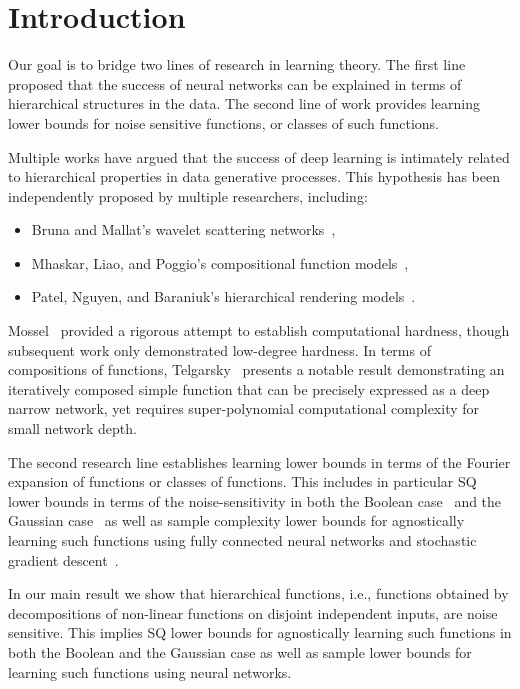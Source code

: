 \documentclass[12pt,letterpaper]{amsart}
\newcommand{\1}[1]{1_{\left\{#1\right\}}}
\theoremstyle{definition}
\theoremstyle{remark}
\begin{document}
\section{Introduction}\label{sec:introduction}

Our goal is to bridge two lines of research in learning theory. The first line proposed that the success of neural networks can be explained in terms 
 of hierarchical structures in the data. 
 The second line of work provides learning lower bounds for noise sensitive functions, or classes of such functions. 
 
Multiple works have argued that the success of deep learning is intimately related to hierarchical properties in data generative processes.
This hypothesis has been independently proposed by multiple researchers, including:
\begin{itemize}
\item
Bruna and Mallat's wavelet scattering networks~\cite{BrunaMallat:13},
\item
Mhaskar, Liao, and Poggio's compositional function models~\cite{MhLiPo:16},
\item
Patel, Nguyen, and Baraniuk's hierarchical rendering models~\cite{PaNgBa:2015}.
\end{itemize}
Mossel~\cite{Mossel:19deep} provided a rigorous attempt to establish computational hardness, though subsequent work \cite{KoehlerMossel:22,HuangMossel:24} only demonstrated low-degree hardness.
In terms of compositions of functions, 
Telgarsky~\cite{Telgarsky:16} presents a notable result demonstrating an iteratively composed simple function that can be precisely expressed as a deep narrow network, yet requires super-polynomial computational complexity for small network depth.

The second research line establishes learning lower bounds in terms of the Fourier expansion of functions or classes of functions. 
This includes in particular SQ lower bounds in terms of the noise-sensitivity in both the Boolean case~\cite{dachman2014approximate} and the Gaussian case~\cite{diakonikolas2021optimality} as well as sample complexity lower bounds for agnostically learning such functions using fully connected neural networks and 
stochastic gradient descent~\cite{ABCKLRZ:22}.

In our main result we show that hierarchical functions, i.e., functions obtained by decompositions of non-linear functions on disjoint independent inputs, are noise sensitive.
This  implies SQ lower bounds for agnostically learning such functions in both the Boolean and the Gaussian case as well as sample lower bounds for learning such functions using neural networks. 
\end{document}
